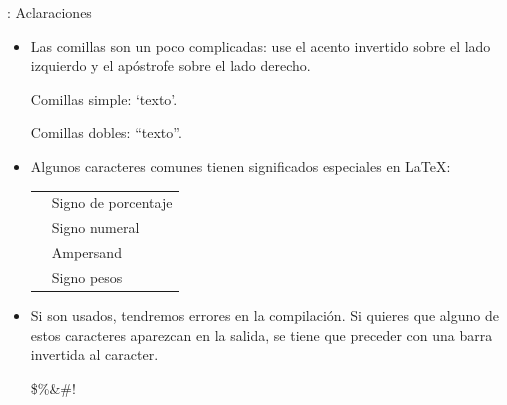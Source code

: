 \documentclass{beamer}
\begin{document}
\begin{frame}[fragile]{\insertsubsection{}: Aclaraciones}
  \small
  \begin{itemize}
  \item Las comillas son un poco complicadas: use el acento invertido
    \keystroke{\`{}} sobre el lado izquierdo y el apóstrofe
    \keystroke{\'{}} sobre el lado derecho.
    \begin{exampletwouptiny}
 Comillas simple: `texto'.

 Comillas dobles: ``texto''.
    \end{exampletwouptiny}
    
  \item Algunos caracteres comunes tienen significados especiales en \LaTeX:\\[1ex]
    \begin{tabular}{cl}
      \keystrokebftt{\%} & Signo de porcentaje \\
      \keystrokebftt{\#} & Signo numeral \\
      \keystrokebftt{\&} & Ampersand                 \\
      \keystrokebftt{\$} & Signo pesos               \\
    \end{tabular}
  \item Si son usados, tendremos errores en la compilación. Si quieres
    que alguno de estos caracteres aparezcan en la salida, se tiene que
    preceder con una barra invertida al caracter.
    \begin{exampletwoup}
\$\%\&\#!
    \end{exampletwoup}
  \end{itemize}
\end{frame}
\end{document}
